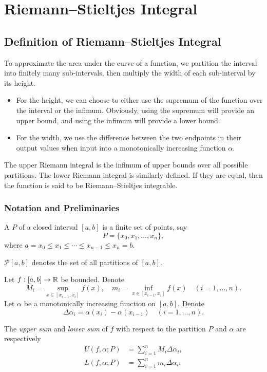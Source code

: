 \chapter{Riemann--Stieltjes Integral}\label{chap:rs-integration}
\section{Definition of Riemann--Stieltjes Integral}
To approximate the area under the curve of a function, we partition the interval into finitely many sub-intervals, then multiply the width of each sub-interval by its height.
\begin{itemize}
\item For the height, we can choose to either use the supremum of the function over the interval or the infimum. Obviously, using the supremum will provide an upper bound, and using the infimum will provide a lower bound.
\item For the width, we use the difference between the two endpoints in their output values when input into a monotonically increasing function $\alpha$.
\end{itemize}

The upper Riemann integral is the infimum of upper bounds over all possible partitions. The lower Riemann integral is similarly defined. If they are equal, then the function is said to be Riemann--Stieltjes integrable.

\subsection{Notation and Preliminaries}
A  $P$ of a closed interval $[a,b]$ is a finite set of points, say
\[P=\{x_0,x_1,\dots,x_n\},\]
where $a=x_0\le x_1\le\cdots\le x_{n-1}\le x_n=b$.

\begin{notation}
$\mathcal{P}[a,b]$ denotes the set of all partitions of $[a,b]$.
\end{notation}

Let $f:[a,b]\to\mathbb R$ be bounded. Denote
\[M_i=\sup_{x\in[x_{i-1},x_i]}f(x),\quad m_i=\inf_{x\in[x_{i-1},x_i]}f(x)\quad(i=1,\dots,n).\]
Let $\alpha$ be a monotonically increasing function on $[a,b]$. Denote
\[\Delta\alpha_i=\alpha(x_i)-\alpha(x_{i-1})\quad(i=1,\dots,n).\]

The \emph{upper sum} and \emph{lower sum} of $f$ with respect to the partition $P$ and $\alpha$ are respectively
\begin{align*}
U(f,\alpha;P)&=\sum_{i=1}^n M_i \Delta \alpha_i,\\
L(f,\alpha;P)&=\sum_{i=1}^n m_i \Delta \alpha_i.
\end{align*}

